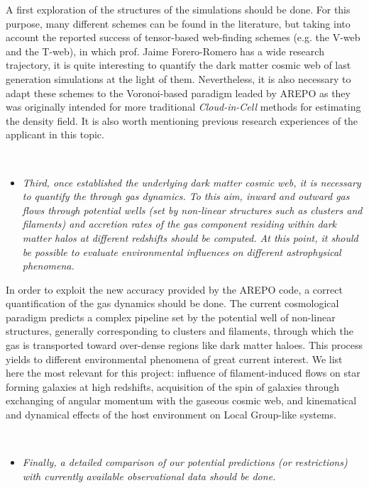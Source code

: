 \documentclass[a4,useAMS,usenatbib,usegraphicx,12pt]{article}
\begin{document}
A first exploration of the structures of the simulations should be done. For
this purpose, many different schemes can be found in the literature, 
but taking into account the reported success of tensor-based 
web-finding schemes (e.g. the V-web and the T-web), in which prof. Jaime 
Forero-Romero has a wide research trajectory, it is quite interesting to 
quantify the dark matter cosmic web of last generation simulations at the light
of them. Nevertheless, it is also necessary to adapt these schemes to the 
Voronoi-based paradigm leaded by AREPO as they was originally intended for 
more traditional \textit{Cloud-in-Cell} methods for estimating the density 
field. It is also worth mentioning previous research experiences of the 
applicant in this topic.

\

\begin{itemize}

\item[\checkmark] \textit{Third, once established the underlying dark matter 
cosmic web, it is necessary to quantify the through gas dynamics. To this aim, 
inward and outward gas flows through potential wells (set by non-linear 
structures such as clusters and filaments) and accretion rates of the gas 
component residing within dark matter halos at different redshifts should be 
computed. At this point, it should be possible to evaluate environmental
influences on different astrophysical phenomena. }

\end{itemize}


In order to exploit the new accuracy provided by the AREPO code, a correct 
quantification of the gas dynamics should be done. The current cosmological 
paradigm predicts a complex pipeline set by the potential well of non-linear 
structures, generally corresponding to clusters and filaments, through which 
the gas is transported toward over-dense regions like dark matter haloes. This
process yields to different environmental phenomena of great current interest.
We list here the most relevant for this project: influence of filament-induced 
flows on star forming galaxies at high redshifts, acquisition of the spin of 
galaxies through exchanging of angular momentum with the gaseous cosmic web, 
and kinematical and dynamical effects of the host environment on Local 
Group-like systems.

\

\begin{itemize}

\item[\checkmark] \textit{Finally, a detailed comparison of our potential 
predictions (or restrictions) with currently available observational data
should be done.}

\end{itemize}
\end{document}
